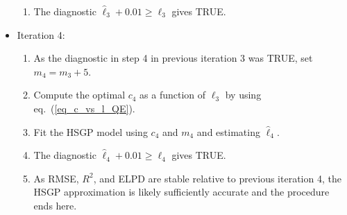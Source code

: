 \begin{itemize}
\begin{enumerate}
	\item The diagnostic $\hat{\ell}_3 + 0.01 \geq \ell_3$ gives TRUE.
	\end{enumerate}
	
\item[] Iteration 4:
	\begin{enumerate}
	\item As the diagnostic in step 4 in previous iteration 3 was TRUE, set $m_4 = m_3 + 5$.
	
	\item Compute the optimal $c_4$ as a function of $\ell_3$ by using eq.~(\ref{eq_c_vs_l_QE}).
	
	\item Fit the HSGP model using $c_4$ and $m_4$ and estimating $\hat{\ell}_4$.
	
	\item The diagnostic $\hat{\ell}_4 + 0.01 \geq \ell_4$ gives TRUE.
	
	\item As RMSE, $R^2$, and ELPD are stable relative to previous iteration 4, the HSGP approximation is likely sufficiently accurate and the procedure ends here.
	\end{enumerate}
	
\end{itemize} 

